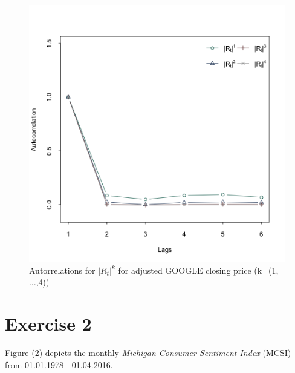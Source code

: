 \documentclass[fleqn]{article}
\begin{document}
\begin{figure}[!htb]
	\centering
	\includegraphics[width=\textwidth]{p1.png}
	\caption{Autorrelations for $|R_t|^{k}$ for adjusted GOOGLE closing price (k=(1,$\dots$,4))}
\end{figure}
 
\pagebreak


\section*{Exercise 2}

Figure (2) depicts the monthly \textit{Michigan Consumer Sentiment Index} (MCSI) from 01.01.1978 - 01.04.2016. 
\end{document}
